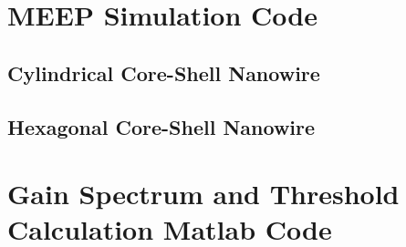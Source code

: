 \chapter{MEEP Simulation Code} \label{ch:meepcode} 
\section{Cylindrical Core-Shell Nanowire}



\section{Hexagonal Core-Shell Nanowire}


\chapter{Gain Spectrum and Threshold Calculation Matlab Code} \label{ch:matlabcode} 

